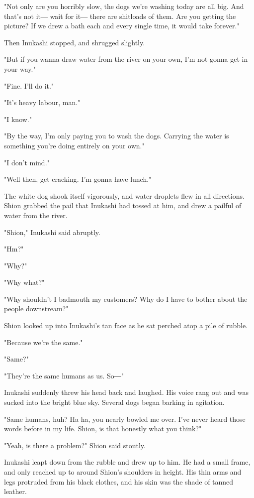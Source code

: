 "Not only are you horribly slow, the dogs we're washing today are all
big. And that's not it― wait for it― there are shitloads of them. Are
you getting the picture? If we drew a bath each and every single time,
it would take forever."

Then Inukashi stopped, and shrugged slightly.

"But if you wanna draw water from the river on your own, I'm not gonna
get in your way."

"Fine. I'll do it."

"It's heavy labour, man."

"I know."

"By the way, I'm only paying you to wash the dogs. Carrying the water is
something you're doing entirely on your own."

"I don't mind."

"Well then, get cracking. I'm gonna have lunch."

The white dog shook itself vigorously, and water droplets flew in all
directions. Shion grabbed the pail that Inukashi had tossed at him, and
drew a pailful of water from the river.

"Shion," Inukashi said abruptly.

"Hm?"

"Why?"

"Why what?"

"Why shouldn't I badmouth my customers? Why do I have to bother about
the people downstream?"

Shion looked up into Inukashi's tan face as he sat perched atop a pile
of rubble.

"Because we're the same."

"Same?"

"They're the same humans as us. So―"

Inukashi suddenly threw his head back and laughed. His voice rang out
and was sucked into the bright blue sky. Several dogs began barking in
agitation.

"Same humans, huh? Ha ha, you nearly bowled me over. I've never heard
those words before in my life. Shion, is that honestly what you think?"

"Yeah, is there a problem?" Shion said stoutly.

Inukashi leapt down from the rubble and drew up to him. He had a small
frame, and only reached up to around Shion's shoulders in height. His
thin arms and legs protruded from his black clothes, and his skin was
the shade of tanned leather.

